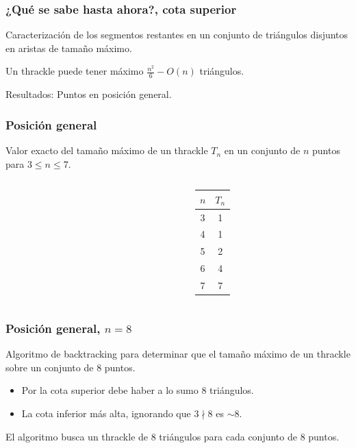 \documentclass{beamer}
\begin{document}
\begin{frame}
  \frametitle{¿Qué se sabe hasta ahora?, cota superior}
  Caracterización de los segmentos restantes en un conjunto de triángulos
  disjuntos en aristas de tamaño máximo.
  \begin{figure}[htb]
    \scriptsize
    
  \end{figure}
  Un thrackle puede tener máximo $\frac{n^2}{6}-O(n)$ triángulos.
\end{frame}

\begin{frame}[c]
  \begin{center}
    \Huge Resultados: Puntos en posición general.
  \end{center}
\end{frame}

\begin{frame}
  \frametitle{Posición general}
  Valor exacto del tamaño máximo de un thrackle $T_n$ en un conjunto de $n$
  puntos para $3\le n\le 7$.
  \begin{columns}
    \hspace{0.7cm}
    \begin{column}{0.6\textwidth}
      \begin{center}
      \begin{figure}[htb]
        \centering
        
      \end{figure}
      \end{center}
    \end{column}
    \begin{column}{0.2\textwidth}
        \begin{tabular}{| c | c |}
          \hline
          \textbf{$n$} & \textbf{$T_n$} \\ \hline
          3 & 1 \\ \hline 
          4 & 1 \\ \hline
          5 & 2 \\ \hline
          6 & 4 \\ \hline
          7 & 7 \\ \hline
        \end{tabular}
    \end{column}
    \hfill
  \end{columns}
\end{frame}

\begin{frame}
  \frametitle{Posición general, $n=8$}
  Algoritmo de backtracking para determinar que el tamaño máximo de un thrackle
  sobre un conjunto de 8 puntos.
  \begin{itemize}
    \item Por la cota superior debe haber a lo sumo 8 triángulos.
    \item La cota inferior más alta, ignorando que $3\nmid8$ es $\sim8$.
  \end{itemize}
  \vspace{0.3cm}
  El algoritmo busca un thrackle de 8 triángulos para cada conjunto de 8
  puntos.
\end{frame}
\end{document}
